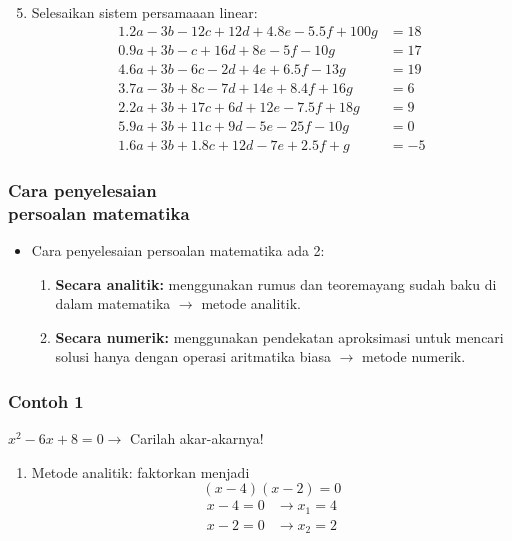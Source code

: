 \documentclass[pdflatex,compress,mathserif]{beamer}
\begin{document}
\begin{frame}
	\begin{enumerate}
		\setcounter{enumi}{4}
		\item Selesaikan sistem persamaaan linear:
		\begin{align*}
			1.2a - 3b -  12c + 12d + 4.8e - 5.5f	+ 100g  &= 18 \\
			0.9a + 3b -    c + 16d +   8e -   5f	-  10g  &= 17 \\
			4.6a + 3b -   6c -  2d +   4e + 6.5f	-  13g  &= 19 \\
			3.7a - 3b +   8c -  7d +  14e + 8.4f	+  16g  &=  6 \\
			2.2a + 3b +  17c +  6d +  12e - 7.5f	+  18g  &=  9 \\
			5.9a + 3b +  11c +  9d -   5e -  25f	-  10g  &=  0 \\
			1.6a + 3b + 1.8c + 12d -   7e + 2.5f	+    g  &= -5
		\end{align*}
	\end{enumerate}
\end{frame}

\begin{frame}
	\frametitle{Cara penyelesaian \\
		persoalan matematika}
	\begin{itemize}
		\item Cara penyelesaian persoalan matematika ada 2:
		\begin{enumerate}
			\item \textbf{Secara analitik:} menggunakan rumus dan teoremayang sudah baku di dalam matematika $\rightarrow$ metode analitik.
			\item \textbf{Secara numerik:} menggunakan pendekatan aproksimasi untuk mencari solusi hanya dengan operasi aritmatika biasa $\rightarrow$ metode numerik.
		\end{enumerate}
	\end{itemize}
\end{frame}

\begin{frame}
	\frametitle{Contoh 1}
	$ x^2 - 6x + 8 = 0 \rightarrow $ Carilah akar-akarnya! \\
	\begin{enumerate}
		\item Metode analitik: faktorkan menjadi $$ (x-4)(x-2) = 0 $$
		\begin{align*}
			x - 4 = 0 &\rightarrow x_1 = 4 \\
			x - 2 = 0 &\rightarrow x_2 = 2
		\end{align*}
	\end{enumerate}
\end{frame}
\end{document}
